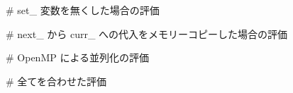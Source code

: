 # set_ 変数を無くした場合の評価








# next_ から curr_ への代入をメモリーコピーした場合の評価







# OpenMP による並列化の評価







# 全てを合わせた評価




